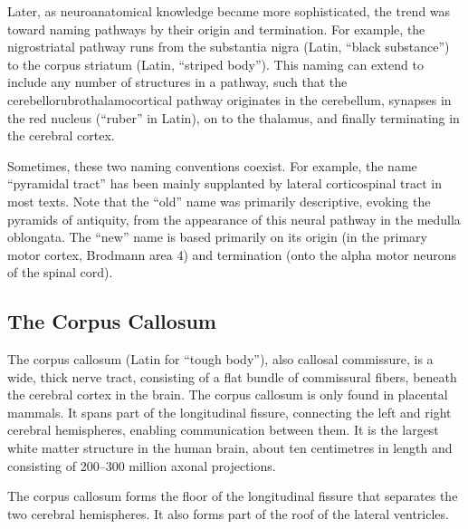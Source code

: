 Later, as neuroanatomical knowledge became more sophisticated, the trend was toward naming pathways by their origin and termination. For example, the nigrostriatal pathway runs from the substantia nigra (Latin, ``black substance'') to the corpus striatum (Latin, ``striped body''). This naming can extend to include any number of structures in a pathway, such that the cerebellorubrothalamocortical pathway originates in the cerebellum, synapses in the red nucleus (``ruber'' in Latin), on to the thalamus, and finally terminating in the cerebral cortex.

Sometimes, these two naming conventions coexist. For example, the name ``pyramidal tract'' has been mainly supplanted by lateral corticospinal tract in most texts. Note that the ``old'' name was primarily descriptive, evoking the pyramids of antiquity, from the appearance of this neural pathway in the medulla oblongata. The ``new'' name is based primarily on its origin (in the primary motor cortex, Brodmann area 4) and termination (onto the alpha motor neurons of the spinal cord).

\hypertarget{the-corpus-callosum}{%
\subsection{The Corpus Callosum}\label{the-corpus-callosum}}

The corpus callosum (Latin for ``tough body''), also callosal commissure, is a wide, thick nerve tract, consisting of a flat bundle of commissural fibers, beneath the cerebral cortex in the brain. The corpus callosum is only found in placental mammals. It spans part of the longitudinal fissure, connecting the left and right cerebral hemispheres, enabling communication between them. It is the largest white matter structure in the human brain, about ten centimetres in length and consisting of 200--300 million axonal projections.

The corpus callosum forms the floor of the longitudinal fissure that separates the two cerebral hemispheres. It also forms part of the roof of the lateral ventricles.



